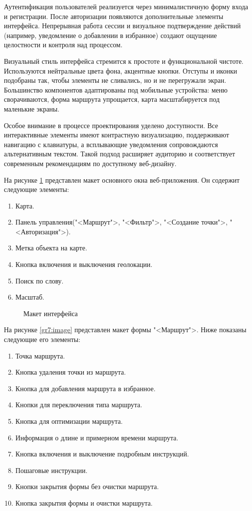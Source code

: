 Аутентификация пользователей реализуется через минималистичную форму входа и регистрации. После авторизации появляются дополнительные элементы интерфейса. Непрерывная работа сессии и визуальное подтверждение действий (например, уведомление о добавлении в избранное) создают ощущение целостности и контроля над процессом.

Визуальный стиль интерфейса стремится к простоте и функциональной чистоте. Используются нейтральные цвета фона, акцентные кнопки. Отступы и иконки подобраны так, чтобы элементы не сливались, но и не перегружали экран. Большинство компонентов адаптированы под мобильные устройства: меню сворачиваются, форма маршрута упрощается, карта масштабируется под маленькие экраны.

Особое внимание в процессе проектирования уделено доступности\cite{b20}. Все интерактивные элементы имеют контрастную визуализацию, поддерживают навигацию с клавиатуры, а всплывающие уведомления сопровождаются альтернативным текстом. Такой подход расширяет аудиторию и соответствует современным рекомендациям по доступному веб-дизайну.

На рисунке \ref{gr1:image} представлен макет основного окна веб-приложения. Он содержит следующие элементы:

\begin{enumerate}
	\item Карта.
	\item Панель управления("<Маршрут">, "<Фильтр">, "<Создание точки">, "<Авторизация">).
	\item Метка объекта на карте.
	\item Кнопка включения и выключения геолокации.
	\item Поиск по слову.
	\item Масштаб.
\end{enumerate}

\vspace{+40mm}
\begin{figure}[ht]
	\center{\texttt{[image: gr1]}}
	\caption{Макет интерфейса}
	\label{gr1:image}
\end{figure}

На рисунке \ref{gr7:image} представлен макет формы "<Маршрут">. Ниже показаны следующие его элементы:

\begin{enumerate}
	\item Точка маршрута.
	\item Кнопка удаления точки из маршрута.
	\item Кнопка для добавления маршрута в избранное.
	\item Кнопки для переключения типа маршрута.
	\item Кнопка для оптимизации маршрута.
	\item Информация о длине и примерном времени маршрута.
	\item Кнопка включения и выключение подробным инструкций.
	\item Пошаговые инструкции.
	\item Кнопки закрытия формы без очистки маршрута.
	\item Кнопка закрытия формы и очистки маршрута.
\end{enumerate}

